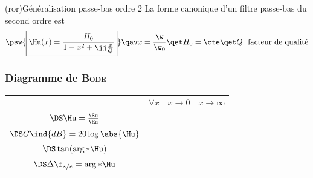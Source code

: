 \documentclass[../../main/main.tex]{subfiles}
\begin{document}
\begin{tcb}(ror){Généralisation passe-bas ordre 2}
	La forme canonique d'un filtre passe-bas du second ordre est
	\[
		\psw{%
		\boxed{\Hu(x) = \frac{H_0}{1-x^{2} + \jj \frac{x}{Q}}}
		}%
		\qav
		x = \frac{\w}{\w_0}
		\qet
		H_0 = \cte
		\qet
		Q \text{~ facteur de qualité}
	\]
	\vspace{-15pt}
\end{tcb}

\subsubsection{Diagramme de \textsc{Bode}}
\noindent
\begin{minipage}{\linewidth}
	\centering
	\begin{tabularx}{\linewidth}{cYYY}
		\toprule
		 &
		$\forall x$
		 &
		$x\to 0$
		 &
		$x\to\infty$
		\\
		\addlinespace[0.5em]
		\cmidrule(lr){2-4}
		$\DS\Hu = \frac{\Su}{\Eu}$
		 &
		 &
		 &
		\\
		\addlinespace[0.5em]
		$\DS G\ind{dB} = 20 \log \abs{\Hu}$
		 &
		 &
		 &
		\\
		\addlinespace[0.5em]
		$\DS\tan(\arg*{\Hu})$
		 &
		 &
		 &
		\\
		\addlinespace[0.5em]
		$\DS\Delta\f_{s/e} = \arg*{\Hu}$
		 &
		\psw{$---$}
		 &
		 &
		\psw{$\DS -\pi$}
		\\
		\bottomrule
	\end{tabularx}
	\label{tab:rlc}
\end{minipage}
\end{document}
